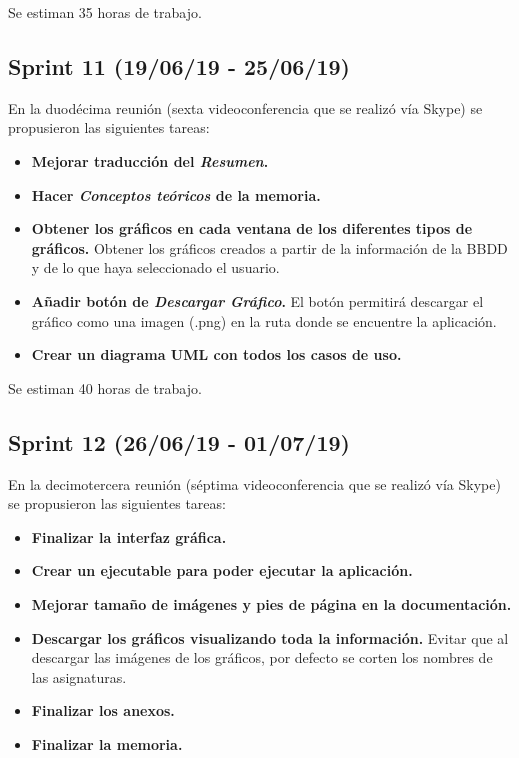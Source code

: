 Se estiman 35 horas de trabajo.


\subsection{Sprint 11 (19/06/19 - 25/06/19)}
En la duodécima reunión (sexta videoconferencia que se realizó vía Skype) se propusieron las siguientes tareas:

\begin{itemize}
\item
\textbf{Mejorar traducción del \emph{Resumen}.}
\item
\textbf{Hacer \emph{Conceptos teóricos} de la memoria.}
\item
\textbf{Obtener los gráficos en cada ventana de los diferentes tipos de gráficos.} Obtener los gráficos creados a partir de la información de la BBDD y de lo que haya seleccionado el usuario.
\item
\textbf{Añadir botón de \emph{Descargar Gráfico}.} El botón permitirá descargar el gráfico como una imagen (.png) en la ruta donde se encuentre la aplicación.
\item
\textbf{Crear un diagrama UML con todos los casos de uso.}
\end{itemize}

Se estiman 40 horas de trabajo.

\subsection{Sprint 12 (26/06/19 - 01/07/19)}

En la decimotercera reunión (séptima videoconferencia que se realizó vía Skype) se propusieron las siguientes tareas:

\begin{itemize}
\item
\textbf{Finalizar la interfaz gráfica.}
\item
\textbf{Crear un ejecutable para poder ejecutar la aplicación.}
\item
\textbf{Mejorar tamaño de imágenes y pies de página en la documentación.}
\item
\textbf{Descargar los gráficos visualizando toda la información.} Evitar que al descargar las imágenes de los gráficos, por defecto se corten los nombres de las asignaturas.
\item
\textbf{Finalizar los anexos.}
\item
\textbf{Finalizar la memoria.}
\end{itemize}

